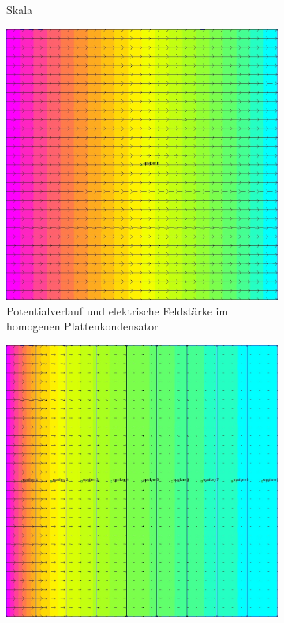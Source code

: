 \begin{figure}[h]
\begin{subfigure}[c]{0.2\textwidth}
		\caption{Skala}
		\label{fig:Skala2}
	\end{subfigure}
	\begin{subfigure}[c]{0.35\textwidth}
		\includegraphics[width=\textwidth]{data/KondensatorN1_EFeld}
		\caption{Potentialverlauf und elektrische Feldstärke im homogenen Plattenkondensator}
		\label{fig:N1_EFeld}
	\end{subfigure}
	\begin{subfigure}[c]{0.35\textwidth}
		\includegraphics[width=\textwidth]{data/KondensatorN9_EFeld}

\end{subfigure}
\end{figure}

